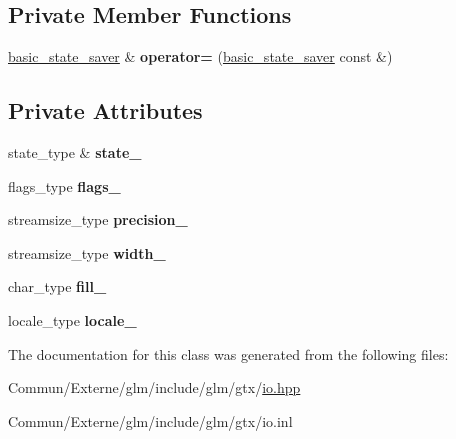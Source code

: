 \subsection*{Private Member Functions}
\begin{DoxyCompactItemize}
\item 
\hyperlink{classglm_1_1io_1_1basic__state__saver}{basic\+\_\+state\+\_\+saver} \& {\bfseries operator=} (\hyperlink{classglm_1_1io_1_1basic__state__saver}{basic\+\_\+state\+\_\+saver} const \&)\hypertarget{classglm_1_1io_1_1basic__state__saver_a06b8637eae186a07ab694fbf490193b5}{}\label{classglm_1_1io_1_1basic__state__saver_a06b8637eae186a07ab694fbf490193b5}

\end{DoxyCompactItemize}
\subsection*{Private Attributes}
\begin{DoxyCompactItemize}
\item 
state\+\_\+type \& {\bfseries state\+\_\+}\hypertarget{classglm_1_1io_1_1basic__state__saver_a969e854089f2df42ee0050d38cc70903}{}\label{classglm_1_1io_1_1basic__state__saver_a969e854089f2df42ee0050d38cc70903}

\item 
flags\+\_\+type {\bfseries flags\+\_\+}\hypertarget{classglm_1_1io_1_1basic__state__saver_a2017c6e006a9e5c0c1ee191aee59c835}{}\label{classglm_1_1io_1_1basic__state__saver_a2017c6e006a9e5c0c1ee191aee59c835}

\item 
streamsize\+\_\+type {\bfseries precision\+\_\+}\hypertarget{classglm_1_1io_1_1basic__state__saver_a1b442206b28b324603599175285fb55a}{}\label{classglm_1_1io_1_1basic__state__saver_a1b442206b28b324603599175285fb55a}

\item 
streamsize\+\_\+type {\bfseries width\+\_\+}\hypertarget{classglm_1_1io_1_1basic__state__saver_a7c2f48c587295d3717b0b6790f78034d}{}\label{classglm_1_1io_1_1basic__state__saver_a7c2f48c587295d3717b0b6790f78034d}

\item 
char\+\_\+type {\bfseries fill\+\_\+}\hypertarget{classglm_1_1io_1_1basic__state__saver_abf8166290d087051954306facad38e00}{}\label{classglm_1_1io_1_1basic__state__saver_abf8166290d087051954306facad38e00}

\item 
locale\+\_\+type {\bfseries locale\+\_\+}\hypertarget{classglm_1_1io_1_1basic__state__saver_a108385f01212b427ebae048eaf181e0d}{}\label{classglm_1_1io_1_1basic__state__saver_a108385f01212b427ebae048eaf181e0d}

\end{DoxyCompactItemize}


The documentation for this class was generated from the following files\+:\begin{DoxyCompactItemize}
\item 
Commun/\+Externe/glm/include/glm/gtx/\hyperlink{io_8hpp}{io.\+hpp}\item 
Commun/\+Externe/glm/include/glm/gtx/io.\+inl\end{DoxyCompactItemize}
